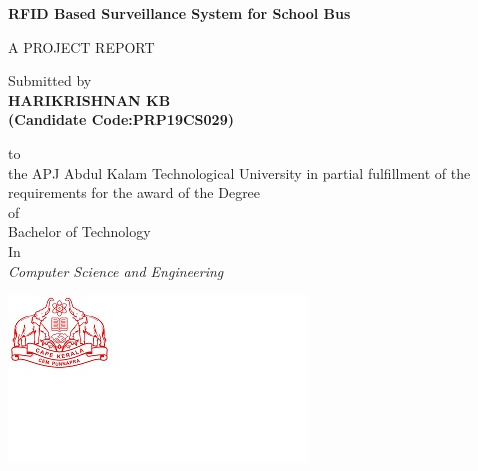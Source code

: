 

\begin{titlepage}
	\begin{center}
		\vspace{0.35cm}
		\vspace{0.5cm}
		\textbf{\Large{RFID Based Surveillance System for School Bus
		}}\\ \vspace{0.9cm}
	
		\normalsize
		
     	\vspace{2cm}
     	A PROJECT REPORT 
		
		Submitted by\\
		\vspace{1cm}
		\textbf{{\selectfont HARIKRISHNAN KB}}\\
		\textbf{{\selectfont(Candidate Code:PRP19CS029)}}\\
		\vspace{1cm}
	        
	         to\\
	         \vspace{1cm}
	         \normalsize
	         \vspace{0.1cm}
	         the APJ Abdul Kalam Technological University in partial fulfillment of the requirements for the award of  the Degree \\
	         \vspace{0.5cm}
	         of\\
	         \vspace{1cm}
	         Bachelor of Technology\\
	            In\\
	            \textit{ Computer Science and Engineering}\\
	\vspace{1cm}
	
		\begin{center}
	\hspace{5cm}
	    	\includegraphics[]{am2.jpg}
	\end{center}
		\normalsize
		

\end{center}
\end{titlepage}
